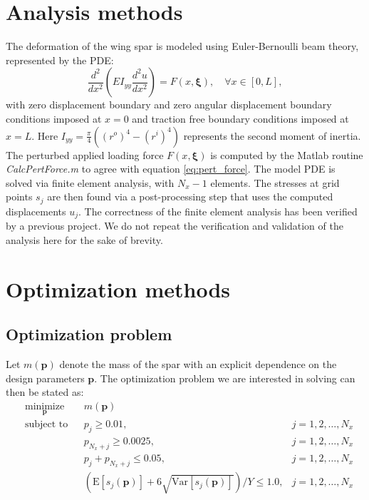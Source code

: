 \documentclass[10pt]{article}
\newcommand{\bs}[1] {\boldsymbol{#1}}
\begin{document}
\section{Analysis methods}

The deformation of the wing spar is modeled using Euler-Bernoulli
beam theory, represented by the PDE:
\begin{equation}
\frac{d^2}{d x^2}
\left( E I_{yy} \frac{d^2 u}{dx^2} \right) =
F(x, \bs{\xi}), \quad \forall x \in [0,L],
\label{eq:pde}
\end{equation}
with zero displacement boundary and zero angular
displacement boundary conditions imposed at
$x=0$ and traction free boundary conditions
imposed at $x=L$. Here $I_{yy} = \frac{\pi}{4}( (r^o)^4 - (r^i)^4)$
represents the second moment of inertia.
The perturbed applied loading force $F(x, \bs{\xi})$
is computed by the Matlab routine
\emph{CalcPertForce.m} to agree with equation
\eqref{eq:pert_force}.
The model PDE is solved via finite element analysis, with
$N_x-1$ elements. The stresses at grid points $s_j$ are then
found via a post-processing step that uses the computed displacements
$u_j$.
The correctness of the finite element analysis
has been verified by a previous project. We do not repeat the
verification and validation of the analysis here for the sake
of brevity.

\section{Optimization methods}

\subsection{Optimization problem}

Let $m(\bs{p})$ denote the mass of the spar with an explicit
dependence on the design parameters $\bs{p}$. The optimization
problem we are interested in solving can then be stated as:
%
\begin{equation*}
\begin{aligned}
& \underset{\bs{p}}{\text{minimize}}
& & m(\bs{p}) \\
& \text{subject to}
& & p_j \geq 0.01,                    &j=1,2,\dots,N_x \\
&&& p_{N_x+j} \geq 0.0025,            &j=1,2,\dots,N_x\\
&&& p_j + p_{N_x +j} \leq 0.05,       &j=1,2,\dots,N_x \\
&&& \left(\text{E}[s_j(\bs{p})] + 6 \sqrt{\text{Var}[s_j(\bs{p})] } \right) / Y \leq 1.0, 
 &j=1,2,\dots,N_x
\end{aligned}
\label{eq:optim}
\end{equation*}
\end{document}
